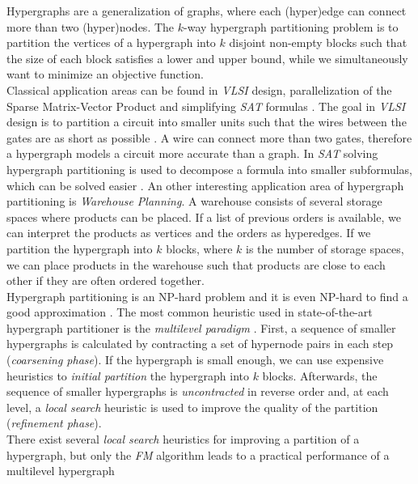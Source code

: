 Hypergraphs are a generalization of graphs, where each (hyper)edge can connect 
more than two (hyper)nodes. The $k$-way hypergraph partitioning problem is to 
partition the vertices of a hypergraph into $k$ disjoint non-empty blocks such
that the size of each block satisfies a lower and upper bound, while we simultaneously 
want to minimize an objective function. \\
Classical application areas can be found in \emph{VLSI} design, parallelization of
the Sparse Matrix-Vector Product and simplifying \emph{SAT} formulas 
\cite{karypis1999multilevel, mann2014formula, papa2007hypergraph}. The goal 
in \emph{VLSI} design is to partition a circuit into smaller units such that
the wires between the gates are as short as possible \cite{bulucc2016recent}.
A wire can connect more than two gates, therefore a hypergraph models a circuit more
accurate than a graph. In \emph{SAT} solving hypergraph partitioning is used to
decompose a formula into smaller subformulas, which can be solved easier \cite{mann2014formula}.
An other interesting application area of hypergraph partitioning is \emph{Warehouse Planning}. 
A warehouse consists of several storage spaces where products can be placed. 
If a list of previous orders is available, we can interpret the products as 
vertices and the orders as hyperedges. If we partition the hypergraph 
into $k$ blocks, where $k$ is the number of storage spaces,
we can place products in the warehouse such that products are close to each other if
they are often ordered together.\\
Hypergraph partitioning is an NP-hard problem \cite{lengauer2012combinatorial} and
it is even NP-hard to find a good approximation \cite{bui1992finding}.
The most common heuristic used in state-of-the-art hypergraph partitioner is the
\emph{multilevel paradigm} \cite{catalyurek1999hypergraph, heuer2017improving, karypis1999multilevel}.
First, a sequence of smaller hypergraphs is calculated by contracting a set of hypernode pairs
in each step (\emph{coarsening phase}). If the hypergraph is small enough, we can use expensive
heuristics to \emph{initial partition} the hypergraph into $k$ blocks. Afterwards, the sequence
of smaller hypergraphs is \emph{uncontracted} in reverse order and, at each level, a 
\emph{local search} heuristic is used to improve the quality of the partition 
(\emph{refinement phase}). \\
There exist several \emph{local search} heuristics for improving a partition of a hypergraph,
but only the \emph{FM} algorithm leads to a practical performance of a multilevel hypergraph
